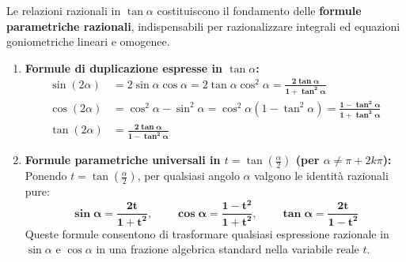 \documentclass[11pt,a4paper,oneside]{report}
\begin{document}
\begin{teorema}
Le relazioni razionali in $\tan\alpha$ costituiscono il fondamento delle \textbf{formule parametriche razionali}, indispensabili per razionalizzare integrali ed equazioni goniometriche lineari e omogenee.
\begin{enumerate}
    \item \textbf{Formule di duplicazione espresse in $\tan\alpha$:}
    \begin{align}
        \sin(2\alpha) &= 2\sin\alpha\cos\alpha = 2\tan\alpha\cos^2\alpha = \mathbf{\frac{2\tan\alpha}{1 + \tan^2\alpha}} \\
        \cos(2\alpha) &= \cos^2\alpha - \sin^2\alpha = \cos^2\alpha(1 - \tan^2\alpha) = \mathbf{\frac{1 - \tan^2\alpha}{1 + \tan^2\alpha}} \\
        \tan(2\alpha) &= \mathbf{\frac{2\tan\alpha}{1 - \tan^2\alpha}}
    \end{align}
    \item \textbf{Formule parametriche universali in $t = \tan\left(\frac{\alpha}{2}\right)$ (per $\alpha \neq \pi + 2k\pi$):}
    Ponendo $t = \tan\left(\frac{\alpha}{2}\right)$, per qualsiasi angolo $\alpha$ valgono le identità razionali pure:
    \begin{equation}
        \mathbf{\sin\alpha = \frac{2t}{1 + t^2}}, \qquad \mathbf{\cos\alpha = \frac{1 - t^2}{1 + t^2}}, \qquad \mathbf{\tan\alpha = \frac{2t}{1 - t^2}}
    \end{equation}
    Queste formule consentono di trasformare qualsiasi espressione razionale in $\sin\alpha$ e $\cos\alpha$ in una frazione algebrica standard nella variabile reale $t$.
\end{enumerate}
\end{teorema}
\end{document}
